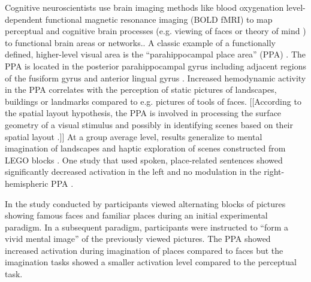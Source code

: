 \documentclass[english]{article}
\begin{document}

Cognitive neuroscientists use brain imaging methods like blood oxygenation
level-dependent functional magnetic resonance imaging (BOLD fMRI) to map
perceptual and cognitive brain processes (e.g. viewing of faces
\citep{kanwisher1997ffa} or theory of mind \citep{spunt2014validating}) to
functional brain areas or networks..
A classic example of a functionally defined, higher-level visual area is the
``parahippocampal place area'' (PPA) \citep{epstein1998ppa,
epstein1999parahippocampal}.
The PPA is located in the posterior parahippocampal gyrus including adjacent
regions of the fusiform gyrus and anterior lingual gyrus
\citep{epstein2008parahippocampal}.
Increased hemodynamic activity in the PPA correlates with the perception of
static pictures of landscapes, buildings or landmarks \citep{aguirre1998area,
epstein2014neural, epstein1998ppa} compared to e.g. pictures of tools of faces.
[[According to the spatial layout hypothesis, the PPA is involved in processing
the surface geometry of a visual stimulus and possibly in identifying scenes
based on their spatial layout \citep{epstein2010reliable}.]]
At a group average level, results generalize to mental imagination of landscapes
\citep{ocraven2000mental} and haptic exploration of scenes constructed from LEGO
blocks \citep{wolbers2011modality}.
One study that used spoken, place-related sentences showed significantly
decreased activation in the left and no modulation in the right-hemispheric PPA
\citep{aziz2008modulation}.

In the study conducted by \cite{ocraven2000mental} participants viewed
alternating blocks of pictures showing famous faces and familiar places during
an initial experimental paradigm. In a subsequent paradigm, participants were
instructed to ``form a vivid mental image'' of the previously viewed pictures.
The PPA showed increased activation during imagination of places compared to
faces but the imagination tasks showed a smaller activation level compared to
the perceptual task.
\end{document}
